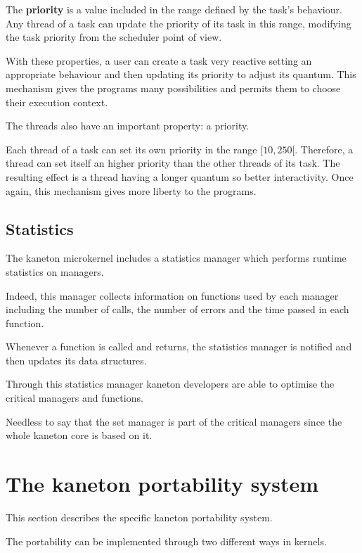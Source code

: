 {\begin{multicols}{2}
The \textbf{priority} is a value included in the range defined by the
task's behaviour. Any thread of a task can update the priority of its
task in this range, modifying the task priority from the scheduler
point of view.

With these properties, a user can create a task very reactive setting an
appropriate behaviour and then updating its priority to adjust its quantum.
This mechanism gives the programs many possibilities and permits them to
choose their execution context.

The threads also have an important property: a priority.

Each thread of a task can set its own priority in the range $[10, 250[$.
Therefore, a thread can set itself an higher priority than the other
threads of its task. The resulting effect is a thread having a longer quantum
so better interactivity. Once again, this mechanism gives more liberty to the
programs.

%
%

\subsection{Statistics}

The kaneton microkernel includes a statistics manager which performs
runtime statistics on managers.

Indeed, this manager collects information on functions used by each manager
including the number of calls, the number of errors and the time passed
in each function.

Whenever a function is called and returns, the statistics manager is notified
and then updates its data structures.

Through this statistics manager kaneton developers are able to optimise
the critical managers and functions.

Needless to say that the set manager is part of the critical managers since
the whole kaneton core is based on it.

%
%

\section{The kaneton portability system}

This section describes the specific kaneton portability system.

The portability can be implemented through two different ways in kernels.


\end{multicols}}
